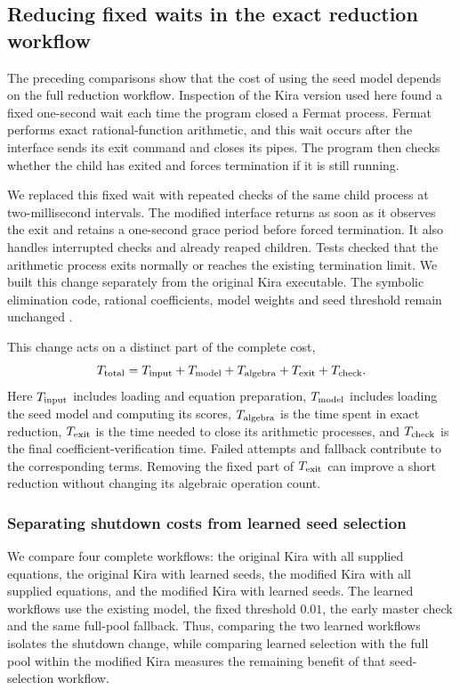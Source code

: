 \subsection{Reducing fixed waits in the exact reduction workflow}
The preceding comparisons show that the cost of using the seed model
depends on the full reduction workflow. Inspection of the Kira version
used here found a fixed one-second wait each time the program closed
a Fermat process. Fermat performs exact rational-function arithmetic,
and this wait occurs after the interface sends its exit command and
closes its pipes. The program then checks whether the child has exited
and forces termination if it is still running.

We replaced this fixed wait with repeated checks of the same child
process at two-millisecond intervals. The modified interface returns
as soon as it observes the exit and retains a one-second grace period
before forced termination. It also handles interrupted checks and
already reaped children. Tests checked that the arithmetic process exits normally or reaches
the existing termination limit. We built this change separately from the original
Kira executable. The symbolic elimination code, rational coefficients,
model weights and seed threshold remain unchanged
\cite{KiraResponsiveExitData}.

This change acts on a distinct part of the complete cost,
\begin{equation}
 T_{\rm total}=T_{\rm input}+T_{\rm model}+T_{\rm algebra}
             +T_{\rm exit}+T_{\rm check}.
\end{equation}
Here $T_{\rm input}$ includes loading and equation preparation,
$T_{\rm model}$ includes loading the seed model and computing its scores,
$T_{\rm algebra}$ is the time spent in exact reduction,
$T_{\rm exit}$ is the time needed to close its arithmetic processes,
and $T_{\rm check}$ is the final coefficient-verification time.
Failed attempts and fallback contribute to the corresponding terms.
Removing the fixed part of $T_{\rm exit}$ can improve a short reduction
without changing its algebraic operation count.

\subsubsection{Separating shutdown costs from learned seed selection}
We compare four complete workflows: the original Kira with all supplied
equations, the original Kira with learned seeds, the modified Kira with
all supplied equations, and the modified Kira with learned seeds.
The learned workflows use the existing model, the fixed threshold
$0.01$, the early master check and the same full-pool fallback.
Thus, comparing the two learned workflows isolates the shutdown change,
while comparing learned selection with the full pool within the modified
Kira measures the remaining benefit of that seed-selection workflow.

